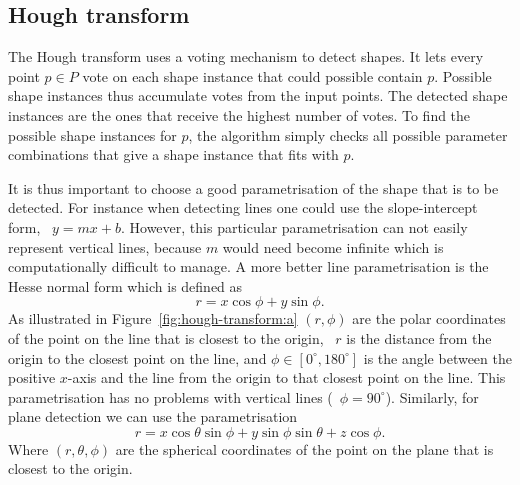 \subsection{Hough transform}
The Hough transform uses a voting mechanism to detect shapes.
It lets every point $p \in P$ vote on each shape instance that could possible contain $p$.
Possible shape instances thus accumulate votes from the input points.
The detected shape instances are the ones that receive the highest number of votes.
To find the possible shape instances for $p$, the algorithm simply checks all possible parameter combinations that give a shape instance that fits with $p$.

It is thus important to choose a good parametrisation of the shape that is to be detected.
For instance when detecting lines one could use the slope-intercept form, \ie\ $y = mx+b$. 
However, this particular parametrisation can not easily represent vertical lines, because $m$ would need become infinite which is computationally difficult to manage. 
A more better line parametrisation is the Hesse normal form which is defined as 
\[
r = x\cos{\phi} + y\sin{\phi}. 
\]
As illustrated in Figure~\ref{fig:hough-transform:a} $(r,\phi)$ are the polar coordinates of the point on the line that is closest to the origin, \ie\ $r$ is the distance from the origin to the closest point on the line, and $\phi \in [0^\circ, 180^\circ]$ is the angle between the positive $x$-axis and the line from the origin to that closest point on the line. 
This parametrisation has no problems with vertical lines (\ie\ $\phi=90^{\circ}$).
Similarly, for plane detection we can use the parametrisation
\[
r = x \cos{\theta} \sin{\phi} + y \sin{\phi} \sin{\theta} + z \cos{\phi}.
\]
Where $(r, \theta, \phi)$ are the spherical coordinates of the point on the plane that is closest to the origin.

